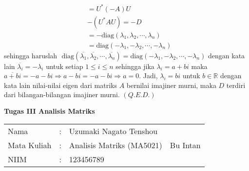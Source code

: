 \documentclass[11pt,a4paper]{article}
\theoremstyle{plain}
\theoremstyle{definition}
\theoremstyle{remark}
\begin{document}
\begin{enumerate}
\begin{enumerate}
\begin{align*}
	&= U^* (-A) U \\
	& -(U^*AU) = -D \\
	&= -\text{diag}(\lambda_{1},\lambda_{2},\cdots,\lambda_{n}) \\
	&= \text{diag}(-\lambda_{1},-\lambda_{2},\cdots,-\lambda_{n})
	\end{align*}
	sehingga haruslah
	$\text{ diag}(\overline{\lambda_{1}},\overline{\lambda_{2}},\cdots,\overline{\lambda_{n}}) = \text{diag}(-\lambda_{1},-\lambda_{2},\cdots,-\lambda_{n})$ dengan kata lain $\overline{\lambda_{i}}=-\lambda_{i}$ untuk setiap $1\le i \le n$ sehingga jika $\lambda_{i}=a+bi$ maka $\overline{a+bi}=-a-bi\Rightarrow a-bi=-a-bi \Rightarrow a=0$. Jadi, $\lambda_{i}=bi$ untuk $b\in \mathbb{R}$ dengan kata lain nilai-nilai eigen dari matriks $A$ bernilai imajiner murni, maka $D$ terdiri dari bilangan-bilangan imajiner murni. $(Q.E.D.)$

\end{enumerate}
	

\newpage
	
	
\begin{center}
	\textbf{Tugas III Analisis Matriks}
\end{center}


\begin{tabular}{llll}
	Nama        & : & Uzumaki Nagato Tenshou    &          \\
	Mata Kuliah & : & Analisis Matriks (MA5021) & Bu Intan \\
	NIIM        & : & 123456789                  &         
\end{tabular}


\begin{enumerate}
	

\end{enumerate}
\end{enumerate}
\end{document}
